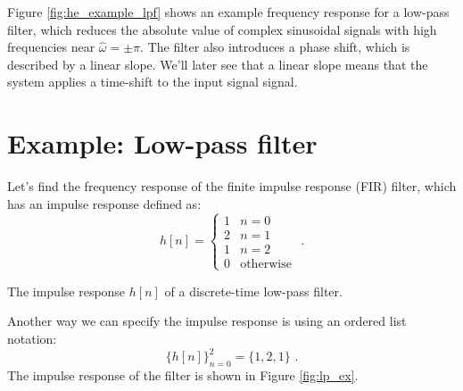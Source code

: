 Figure \ref{fig:he_example_lpf} shows an example frequency response
for a low-pass filter, which reduces the absolute value of complex
sinusoidal signals with high frequencies near
$\hat{\omega}=\pm \pi$. The filter also introduces a phase shift,
which is described by a linear slope. We'll later see that a linear
slope means that the system applies a time-shift to the input signal
signal.

\section{Example: Low-pass filter}

Let's find the frequency response of the finite impulse response (FIR)
filter, which has an impulse response defined as:
\begin{equation}
h[n] = \left\{\begin{array}{cc}
1 & n=0\\
2 & n=1\\
1 & n=2\\
0 & \mathrm{otherwise}
\end{array} \,\,.
\right.
\end{equation}
\begin{marginfigure}
\begin{center}
\end{center}
\caption{The impulse response $h[n]$ of a discrete-time low-pass filter.}
\label{fig:lp_ex}
\end{marginfigure}
\noindent Another way we can specify the impulse response is using an ordered list notation:
\begin{equation}
\{h[n]\}_{n=0}^{2} = \{1,2,1\} \,\,.
\end{equation}
The impulse response of the filter is shown in Figure \ref{fig:lp_ex}.

